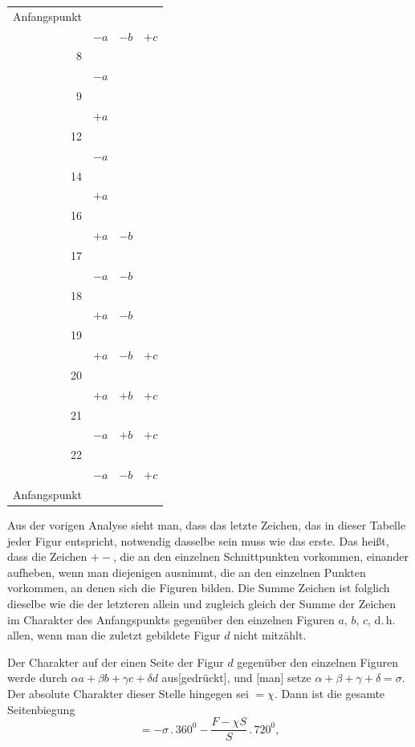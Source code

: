 %
\begin{center}\begin{tabular}{r|ccc}
Anfangspunkt&&&\\
&$-a$&$-b$&$+c$\\
8&&&\\
&$-a$&&\\
9&&&\\
&$+a$&&\\
12&&&\\
&$-a$&&\\
14&&&\\
&$+a$&&\\
16&&&\\
&$+a$&$-b$&\\
17&&&\\
&$-a$&$-b$&\\
18&&&\\
&$+a$&$-b$&\\
19&&&\\
&$+a$&$-b$&$+c$\\
20&&&\\
&$+a$&$+b$&$+c$\\
21&&&\\
&$-a$&$+b$&$+c$\\
22&&&\\
&$-a$&$-b$&$+c$\\
Anfangspunkt&&&\\
\end{tabular}\end{center}
Aus der vorigen Analyse sieht man, dass das letzte Zeichen, das in
dieser Tabelle jeder Figur entspricht, notwendig dasselbe sein muss
wie das erste. Das heißt, dass die Zeichen $+-$, die an den einzelnen
Schnittpunkten vorkommen, einander aufheben, wenn man diejenigen ausnimmt, die an den
einzelnen Punkten vorkommen, an denen sich die Figuren bilden.
Die Summe  Zeichen ist folglich dieselbe wie die der letzteren allein und
zugleich gleich der Summe der Zeichen im Charakter des
Anfangspunkts gegenüber den einzelnen Figuren $a$, $b$, $c$, d.\,h. allen,
wenn man die zuletzt gebildete Figur $d$ nicht mitzählt.
\par{}
Der Charakter auf der einen Seite der Figur $d$ gegenüber den einzelnen
Figuren werde durch $\alpha a+\beta b+\gamma c+\delta d$ aus[gedrückt],
und [man] setze $\alpha+\beta+\gamma+\delta=\sigma$. Der absolute
Charakter dieser Stelle hingegen sei $=\chi$. Dann ist die gesamte
Seitenbiegung
\[
= -\sigma\,.\,360^0 - \frac{F-\chi S}{S}\,.\,720^0,
\]
